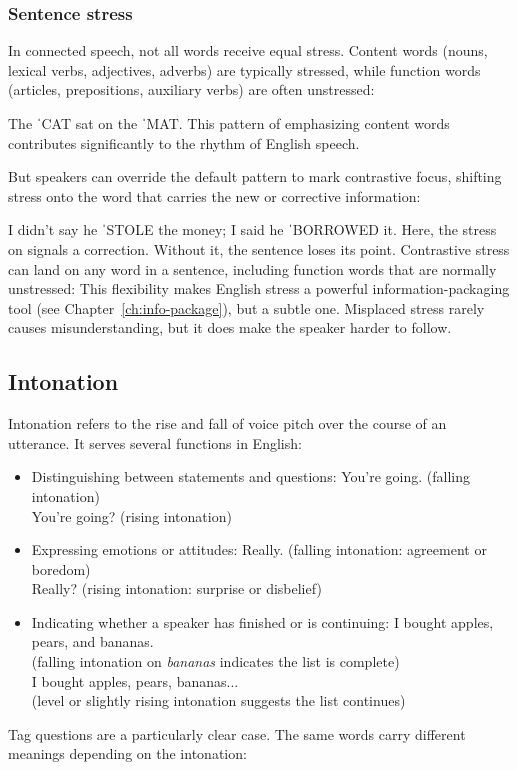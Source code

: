 \subsubsection{Sentence stress}

In connected speech, not all words receive equal stress. Content words (nouns, lexical verbs, adjectives, adverbs) are typically stressed, while function words (articles, prepositions, auxiliary verbs) are often unstressed:

\ea The ˈCAT sat on the ˈMAT.
\z
This pattern of emphasizing content words contributes significantly to the rhythm of English speech.

But speakers can override the default pattern to mark contrastive focus, shifting stress onto the word that carries the new or corrective information:

\ea I didn't say he ˈSTOLE the money; I said he ˈBORROWED it.
\z
Here, the stress on  signals a correction. Without it, the sentence loses its point. Contrastive stress can land on any word in a sentence, including function words that are normally unstressed:  This flexibility makes English stress a powerful information-packaging tool (see Chapter~\ref{ch:info-package}), but a subtle one. Misplaced stress rarely causes misunderstanding, but it does make the speaker harder to follow.

\subsection{Intonation}\label{sec:intonation}

Intonation refers to the rise and fall of voice pitch over the course of an utterance. It serves several functions in English:

\begin{itemize}[noitemsep]
    \item Distinguishing between statements and questions:
        \ea
        You're going. \hfill(falling intonation)\\
        You're going? \hfill(rising intonation)
        \z
    \item Expressing emotions or attitudes:
        \ea
        Really. \hfill(falling intonation: agreement or boredom)\\
        Really? \hfill(rising intonation: surprise or disbelief)
        \z
    \item Indicating whether a speaker has finished or is continuing:
        \ea
        I bought apples, pears, and bananas. \\\hfill(falling intonation on \emph{bananas} indicates the list is complete)\\
        I bought apples, pears, bananas... \\\hfill(level or slightly rising intonation suggests the list continues)
        \z
\end{itemize}
Tag questions are a particularly clear case. The same words carry different meanings depending on the intonation:

